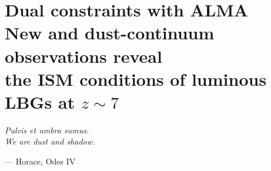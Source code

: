\chapter[Dual constraints with ALMA]{Dual constraints with ALMA \\[2ex]\large{New \texorpdfstring{\OIIILam}{[O III] 88 μm} and dust-continuum observations reveal\\[-1ex]the ISM conditions of luminous LBGs at \texorpdfstring{$z \sim 7$}{z ∼ 7}}}
\label{ch:Dual_constraints_with_ALMA}

\ifsetDraft
\else
    \vspace{8ex}
    \setlength{\epigraphwidth}{0.25\textwidth}
    \epigraph{\textit{Pulvis et umbra sumus.}
        \\
        \vspace{2ex}
        \textit{We are dust and shadow.}}{--- Horace, Odes IV}

    
    \BgThispage
    
